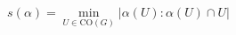 \documentclass[preview]{standalone}
\begin{document}
\begin{align*}
s(\alpha) = \min_{U \in \mathrm{CO}(G)}\left|\alpha(U) : \alpha(U) \cap U\right|
\end{align*}
\end{document}

